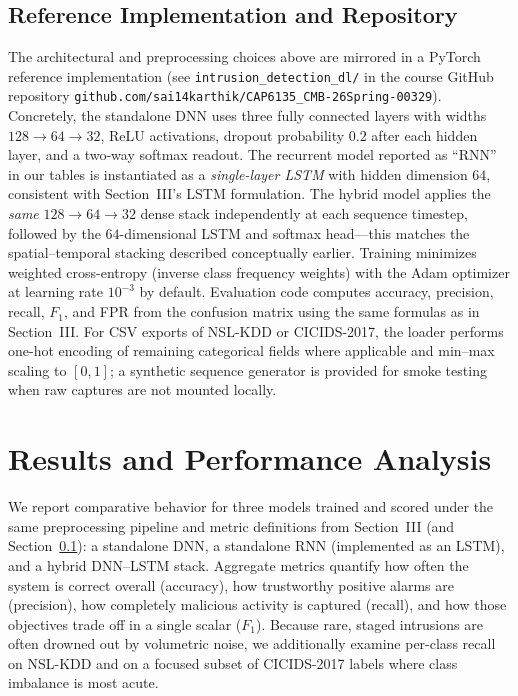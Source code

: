 \documentclass[10pt, conference, compsocconf, letterpaper, twocolumn, twoside]{IEEEtran}
\begin{document}
\subsection{Reference Implementation and Repository}
\label{sec:refimpl}
The architectural and preprocessing choices above are mirrored in a PyTorch reference implementation (see \texttt{intrusion\_detection\_dl/} in the course GitHub repository \texttt{github.com/sai14karthik/CAP6135\_CMB-26Spring-00329}). Concretely, the standalone DNN uses three fully connected layers with widths $128\!\rightarrow\!64\!\rightarrow\!32$, ReLU activations, dropout probability $0.2$ after each hidden layer, and a two-way softmax readout. The recurrent model reported as ``RNN'' in our tables is instantiated as a \emph{single-layer LSTM} with hidden dimension $64$, consistent with Section~III's LSTM formulation. The hybrid model applies the \emph{same} $128\!\rightarrow\!64\!\rightarrow\!32$ dense stack independently at each sequence timestep, followed by the $64$-dimensional LSTM and softmax head---this matches the spatial--temporal stacking described conceptually earlier. Training minimizes weighted cross-entropy (inverse class frequency weights) with the Adam optimizer at learning rate $10^{-3}$ by default. Evaluation code computes accuracy, precision, recall, $F_1$, and FPR from the confusion matrix using the same formulas as in Section~III. For CSV exports of NSL-KDD or CICIDS-2017, the loader performs one-hot encoding of remaining categorical fields where applicable and min--max scaling to $[0,1]$; a synthetic sequence generator is provided for smoke testing when raw captures are not mounted locally.

\section{Results and Performance Analysis}
We report comparative behavior for three models trained and scored under the same preprocessing pipeline and metric definitions from Section~III (and Section~\ref{sec:refimpl}): a standalone DNN, a standalone RNN (implemented as an LSTM), and a hybrid DNN--LSTM stack. Aggregate metrics quantify how often the system is correct overall (accuracy), how trustworthy positive alarms are (precision), how completely malicious activity is captured (recall), and how those objectives trade off in a single scalar ($F_1$). Because rare, staged intrusions are often drowned out by volumetric noise, we additionally examine per-class recall on NSL-KDD and on a focused subset of CICIDS-2017 labels where class imbalance is most acute.
\end{document}
